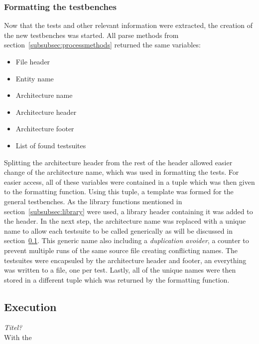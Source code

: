 \documentclass[11pt,british]{article}
\begin{document}
\subsubsection{Formatting the testbenches}
\label{subsubsec:testformat}
Now that the tests and other relevant information were extracted, the creation of the new testbenches was started. All parse methods from section~\ref{subsubsec:processmethods} returned the same variables:
\begin{multicols}{2}
\begin{itemize}[itemsep=-0.1cm]
\item File header
\item Entity name
\item Architecture name
\end{itemize}
\columnbreak
\begin{itemize}[itemsep=-0.1cm]
\item Architecture header
\item Architecture footer
\item List of found testsuites
\end{itemize}
\end{multicols}
\noindent Splitting the architecture header from the rest of the header allowed easier change of the architecture name, which was used in formatting the tests. For easier access, all of these variables were contained in a tuple which was then given to the formatting function. Using this tuple, a template was formed for the general testbenches. As the library functions mentioned in section~\ref{subsubsec:library} were used, a library header containing it was added to the header. In the next step, the architecture name was replaced with a unique name to allow each testsuite to be called generically as will be discussed in section~\ref{subsec:executing}. This generic name also including a \emph{duplication avoider}, a counter to prevent multiple runs of the same source file creating conflicting names. The testsuites were encapsuled by the architecture header and footer, an everything was written to a file, one per test. Lastly, all of the unique names were then stored in a different tuple which was returned by the formatting function.

\subsection{Execution}
\label{subsec:executing}
\emph{\color{red}Titel?}\\
With the 
\end{document}
